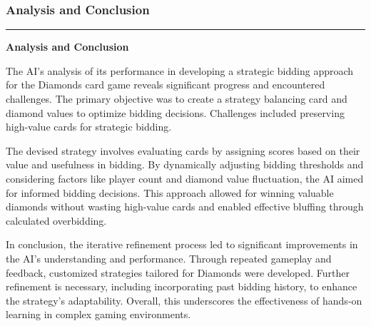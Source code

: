 \documentclass{article}
\begin{document}
\newpage
\begin{frame}
\frametitle{\LARGE Analysis and Conclusion}
\vspace{0.5cm}
\centering
\textcolor{gray}{\rule{\linewidth}{0.5pt}}
{\centering\textbf{\LARGE Analysis and Conclusion}\par}

\raggedright
\Large
The AI's analysis of its performance in developing a strategic bidding approach for the Diamonds card game reveals significant progress and encountered challenges. The primary objective was to create a strategy balancing card and diamond values to optimize bidding decisions. Challenges included preserving high-value cards for strategic bidding.

\vspace{1cm}
The devised strategy involves evaluating cards by assigning scores based on their value and usefulness in bidding. By dynamically adjusting bidding thresholds and considering factors like player count and diamond value fluctuation, the AI aimed for informed bidding decisions. This approach allowed for winning valuable diamonds without wasting high-value cards and enabled effective bluffing through calculated overbidding.

\vspace{1cm}
In conclusion, the iterative refinement process led to significant improvements in the AI's understanding and performance. Through repeated gameplay and feedback, customized strategies tailored for Diamonds were developed. Further refinement is necessary, including incorporating past bidding history, to enhance the strategy's adaptability. Overall, this underscores the effectiveness of hands-on learning in complex gaming environments.

\vspace{1cm}
\end{frame}
\end{document}
